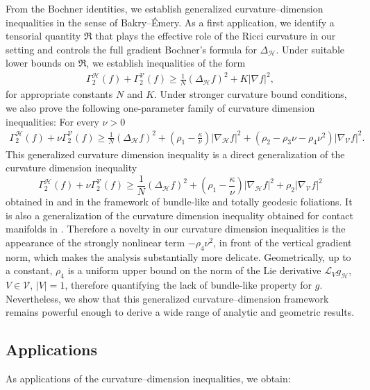 \documentclass[11pt]{article}
\numberwithin{equation}{section}
\newcommand{\Ho}{\mathcal H}
\newcommand{\V}{\mathcal V}
\begin{document}
From the Bochner identities, we establish generalized curvature–dimension inequalities in the sense of Bakry–Émery. 
As a first application, we identify a tensorial quantity $\mathfrak R$ that plays the effective role of the Ricci curvature in our setting and controls the full gradient Bochner's formula for $\Delta_{\mathcal H}$. Under suitable lower bounds on $\mathfrak R$, we establish inequalities of the form
\begin{align}\label{CD basic intro}
\Gamma_2^{\mathcal H}(f)+\Gamma_2^{\mathcal V}(f) \ge \frac{1}{N}(\Delta_{\mathcal H}f)^2 + K\lvert\nabla f\rvert^2,
\end{align}
for appropriate constants $N$ and $K$. Under stronger curvature bound conditions, we also prove the following one-parameter family of curvature dimension inequalities: For every $\nu >0$
\begin{align}\label{CD intro}
\Gamma^\Ho_2 (f)+ \nu \Gamma_2^\V (f) \ge \frac{1}{N}(\Delta_\Ho f)^2 +\left(\rho_1-\frac{\kappa}{\nu} \right) | \nabla_\Ho f|^2+ (\rho_2 -\rho_3 \nu -\rho_4 \nu^2) | \nabla_\V f|^2.
\end{align}
This generalized curvature dimension inequality is a direct generalization of the  curvature dimension inequality
\[
\Gamma^\Ho_2 (f)+ \nu \Gamma_2^\V (f) \ge \frac{1}{N}(\Delta_\Ho f)^2 +\left(\rho_1-\frac{\kappa}{\nu} \right) | \nabla_\Ho f|^2+ \rho_2 | \nabla_\V f|^2
\]
obtained in \cite{BG17} and \cite{GrTh16a} in the framework of bundle-like and totally geodesic foliations. It is also a generalization of the curvature dimension inequality obtained for contact manifolds in \cite{BW14}. Therefore a novelty in our curvature dimension inequalities is the appearance of the strongly nonlinear term $  - \rho_4 \nu^2$, in front of the vertical gradient norm, which makes the analysis substantially more delicate. Geometrically, up to a constant, $\rho_4$ is a uniform upper bound on the  norm of the Lie derivative $\mathcal{L}_V g_\mathcal{H} $, $V \in \V$, $|V|=1$, therefore quantifying the lack of bundle-like property for $g$. Nevertheless, we show that this generalized curvature–dimension framework remains powerful enough to derive a wide range of analytic and geometric results. 

\subsection{Applications}

As applications of the curvature–dimension inequalities, we obtain:
\end{document}
